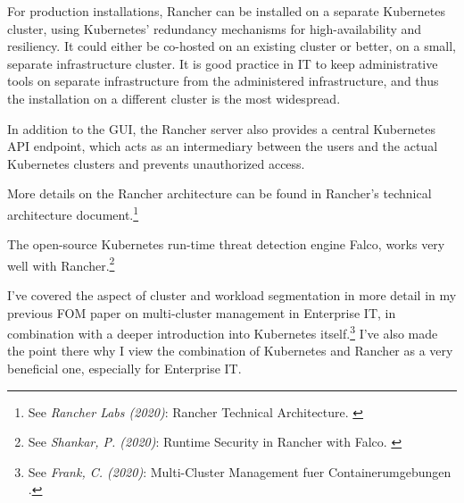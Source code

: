For production installations, Rancher can be installed on a separate Kubernetes cluster, using Kubernetes' redundancy mechanisms for high-availability and resiliency. It could either be co-hosted on an existing cluster or better, on a small, separate infrastructure cluster. It is good practice in IT to keep administrative tools on separate infrastructure from the administered infrastructure, and thus the installation on a different cluster is the most widespread.

In addition to the GUI, the Rancher server also provides a central Kubernetes API endpoint, which acts as an intermediary between the users and the actual Kubernetes clusters and prevents unauthorized access.

More details on the Rancher architecture can be found in Rancher's technical architecture document.\footnote{See \textit{Rancher Labs (2020)}: Rancher Technical Architecture. \cite{technicalArchitecture}}

The open-source Kubernetes run-time threat detection engine Falco, works very well with Rancher.\footnote{See \textit{Shankar, P. (2020)}: Runtime Security in Rancher with Falco. \cite{falcoPsp}}

I've covered the aspect of cluster and workload segmentation in more detail in my previous FOM paper on multi-cluster management in Enterprise IT, in combination with a deeper introduction into Kubernetes itself.\footnote{See \textit{Frank, C. (2020)}: Multi-Cluster Management fuer Containerumgebungen .\cite{previousPaper}} I've also made the point there why I view the combination of Kubernetes and Rancher as a very beneficial one, especially for Enterprise IT.
